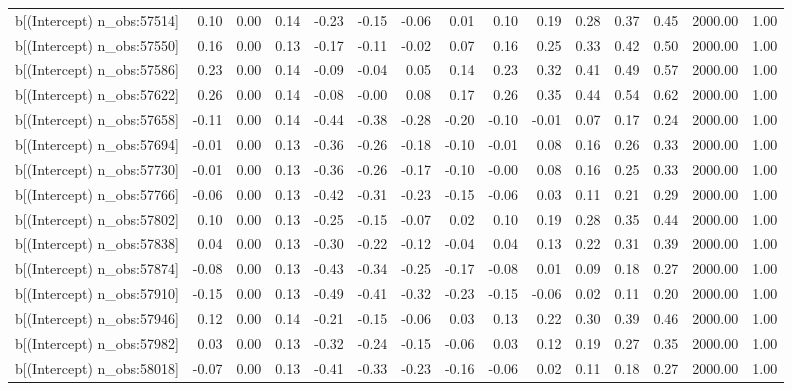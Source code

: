 \begin{table}[ht]
\begin{tabular}{rrrrrrrrrrrrrrr}
  b[(Intercept) n\_obs:57514] & 0.10 & 0.00 & 0.14 & -0.23 & -0.15 & -0.06 & 0.01 & 0.10 & 0.19 & 0.28 & 0.37 & 0.45 & 2000.00 & 1.00 \\ 
  b[(Intercept) n\_obs:57550] & 0.16 & 0.00 & 0.13 & -0.17 & -0.11 & -0.02 & 0.07 & 0.16 & 0.25 & 0.33 & 0.42 & 0.50 & 2000.00 & 1.00 \\ 
  b[(Intercept) n\_obs:57586] & 0.23 & 0.00 & 0.14 & -0.09 & -0.04 & 0.05 & 0.14 & 0.23 & 0.32 & 0.41 & 0.49 & 0.57 & 2000.00 & 1.00 \\ 
  b[(Intercept) n\_obs:57622] & 0.26 & 0.00 & 0.14 & -0.08 & -0.00 & 0.08 & 0.17 & 0.26 & 0.35 & 0.44 & 0.54 & 0.62 & 2000.00 & 1.00 \\ 
  b[(Intercept) n\_obs:57658] & -0.11 & 0.00 & 0.14 & -0.44 & -0.38 & -0.28 & -0.20 & -0.10 & -0.01 & 0.07 & 0.17 & 0.24 & 2000.00 & 1.00 \\ 
  b[(Intercept) n\_obs:57694] & -0.01 & 0.00 & 0.13 & -0.36 & -0.26 & -0.18 & -0.10 & -0.01 & 0.08 & 0.16 & 0.26 & 0.33 & 2000.00 & 1.00 \\ 
  b[(Intercept) n\_obs:57730] & -0.01 & 0.00 & 0.13 & -0.36 & -0.26 & -0.17 & -0.10 & -0.00 & 0.08 & 0.16 & 0.25 & 0.33 & 2000.00 & 1.00 \\ 
  b[(Intercept) n\_obs:57766] & -0.06 & 0.00 & 0.13 & -0.42 & -0.31 & -0.23 & -0.15 & -0.06 & 0.03 & 0.11 & 0.21 & 0.29 & 2000.00 & 1.00 \\ 
  b[(Intercept) n\_obs:57802] & 0.10 & 0.00 & 0.13 & -0.25 & -0.15 & -0.07 & 0.02 & 0.10 & 0.19 & 0.28 & 0.35 & 0.44 & 2000.00 & 1.00 \\ 
  b[(Intercept) n\_obs:57838] & 0.04 & 0.00 & 0.13 & -0.30 & -0.22 & -0.12 & -0.04 & 0.04 & 0.13 & 0.22 & 0.31 & 0.39 & 2000.00 & 1.00 \\ 
  b[(Intercept) n\_obs:57874] & -0.08 & 0.00 & 0.13 & -0.43 & -0.34 & -0.25 & -0.17 & -0.08 & 0.01 & 0.09 & 0.18 & 0.27 & 2000.00 & 1.00 \\ 
  b[(Intercept) n\_obs:57910] & -0.15 & 0.00 & 0.13 & -0.49 & -0.41 & -0.32 & -0.23 & -0.15 & -0.06 & 0.02 & 0.11 & 0.20 & 2000.00 & 1.00 \\ 
  b[(Intercept) n\_obs:57946] & 0.12 & 0.00 & 0.14 & -0.21 & -0.15 & -0.06 & 0.03 & 0.13 & 0.22 & 0.30 & 0.39 & 0.46 & 2000.00 & 1.00 \\ 
  b[(Intercept) n\_obs:57982] & 0.03 & 0.00 & 0.13 & -0.32 & -0.24 & -0.15 & -0.06 & 0.03 & 0.12 & 0.19 & 0.27 & 0.35 & 2000.00 & 1.00 \\ 
  b[(Intercept) n\_obs:58018] & -0.07 & 0.00 & 0.13 & -0.41 & -0.33 & -0.23 & -0.16 & -0.06 & 0.02 & 0.11 & 0.18 & 0.27 & 2000.00 & 1.00 \\ 

\end{tabular}
\end{table}
